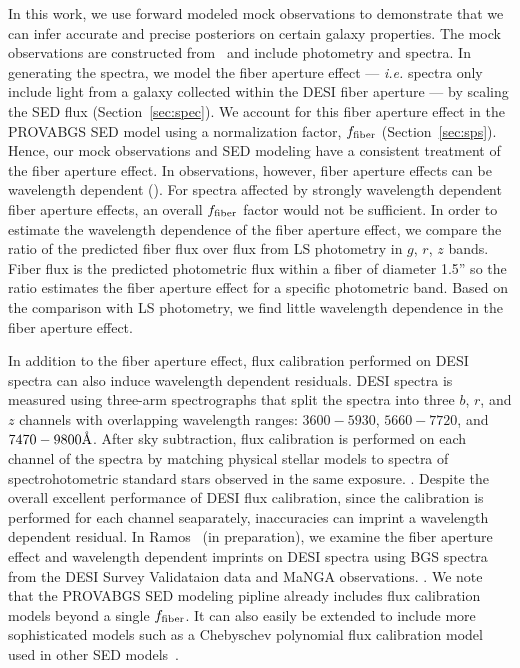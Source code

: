 In this work, we use forward modeled mock observations to demonstrate that we
can infer accurate and precise posteriors on certain galaxy properties.
The mock observations are constructed from \lgal~and include photometry and
spectra. 
In generating the spectra, we model the fiber aperture effect --- \emph{i.e.}
spectra only include light from a galaxy collected within the DESI fiber
aperture --- by scaling the SED flux (Section~\ref{sec:spec}).
We account for this fiber aperture effect in the {\sc PROVABGS} SED model using 
a normalization factor, $f_{\rm fiber}$ (Section~\ref{sec:sps}). 
Hence, our mock observations and SED modeling have a consistent treatment of
the fiber aperture effect. 
In observations, however, fiber aperture effects can be wavelength dependent
(). 
For spectra affected by strongly wavelength dependent fiber aperture effects,
an overall $f_{\rm fiber}$ factor would not be sufficient.
In order to estimate the wavelength dependence of the fiber aperture
effect, we compare the ratio of the predicted fiber flux over flux from LS
photometry in  $g$, $r$, $z$ bands. 
Fiber flux is the predicted photometric flux within a fiber of diameter 1.5''
so the ratio estimates the fiber aperture effect for a specific photometric band. 
Based on the comparison with LS photometry, we find little wavelength
dependence in the fiber aperture effect. 

In addition to the fiber aperture effect, flux calibration performed on DESI
spectra can also induce wavelength dependent residuals. 
DESI spectra is measured using three-arm spectrographs that split the spectra
into three $b$, $r$, and $z$ channels with overlapping wavelength ranges: 
$3600 - 5930$, $5660 - 7720$, and $7470 - 9800 \AA$.  
After sky subtraction, flux calibration is performed on each channel of the
spectra by matching physical stellar models to spectra of spectrohotometric
standard stars observed in the same exposure. 
. 
Despite the overall excellent performance of DESI flux calibration, since the
calibration is performed for each channel seaparately, inaccuracies can imprint
a wavelength dependent residual. 
In Ramos \etal~(in preparation), we examine the fiber aperture effect and
wavelength dependent imprints on DESI spectra using BGS spectra from the DESI
Survey Validataion data and MaNGA observations. 
. 
We note that the {\sc PROVABGS} SED modeling pipline already includes flux
calibration models beyond a single $f_{\rm fiber}$. 
It can also easily be extended to include more sophisticated models such as a
Chebyschev polynomial flux calibration model used in other SED
models~\citep[\emph{e.g.}][]{carnall2017, tacchella2021}. 

